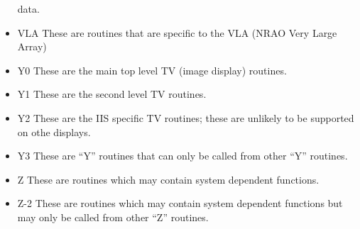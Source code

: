 \begin{itemize}
data.
\item VLA  These are routines that are specific to the VLA (NRAO Very
Large Array)
\item Y0  These are the main top level TV (image display) routines.
\item Y1  These are the second level TV routines.
\item Y2  These are the IIS specific TV routines; these are unlikely
to be supported on othe displays.
\item Y3  These are ``Y'' routines that can only be called from other
``Y'' routines.
\item Z  These are routines which may contain system dependent
functions.
\item Z-2  These are routines which may contain system dependent
functions but may only be called from other ``Z'' routines.
\end{itemize}  %
 
 
